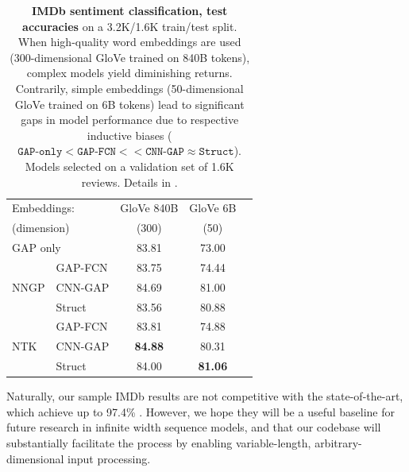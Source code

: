 \documentclass{article}
\begin{document}
\begin{table}[t]
\caption{\textbf{IMDb sentiment classification, test accuracies} on a 3.2K/1.6K train/test split. When high-quality word embeddings are used (300-dimensional GloVe trained on 840B tokens), complex models yield diminishing returns. Contrarily, simple embeddings (50-dimensional GloVe trained on 6B tokens) lead to significant gaps in model performance due to respective inductive biases ($\texttt{GAP-only} < \texttt{GAP-FCN} << \texttt{CNN-GAP} \approx \texttt{Struct}$). Models selected on a validation set of 1.6K reviews. Details in .}\label{tab:imdb_small_results}
\vskip 0.15in
\begin{sc}
\begin{small}
\begin{tabularx}{\columnwidth}{X X c c c}
\toprule
\multicolumn{2}{l}{Embeddings:}     & GloVe 840B      & GloVe 6B        \\
\multicolumn{2}{l}{(dimension)} & (300)             & (50)               \\
\midrule
\multicolumn{2}{l}{GAP only}            & 83.81          & 73.00         \\
\midrule
\multirow{3}{*}{NNGP}      & GAP-FCN        & 83.75          & 74.44         \\
                           & CNN-GAP        & 84.69          & 81.00         \\
                           & Struct     & 83.56          & 80.88         \\
\midrule
\multirow{3}{*}{NTK}       & GAP-FCN        & 83.81          & 74.88          \\
                           & CNN-GAP        & \textbf{84.88} & 80.31          \\
                           & Struct     & 84.00          & \textbf{81.06}  \\
\bottomrule
\end{tabularx}
\end{small}
\end{sc}
\vskip -0.18in
\end{table}

Naturally, our sample IMDb results are not competitive with the state-of-the-art, which achieve up to 97.4\% \citep[Table 4]{thongtan-phienthrakul-2019-sentiment}. However, we hope they will be a useful baseline for future research in infinite width sequence models, and that our codebase will substantially facilitate the process by enabling variable-length, arbitrary-dimensional input processing.
 
\end{document}
